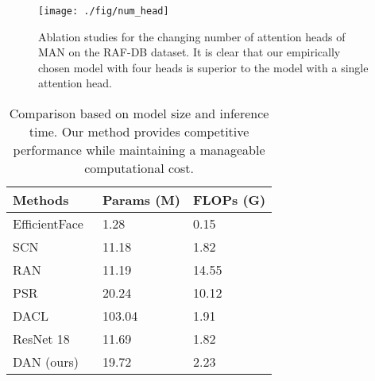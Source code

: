 \documentclass{article}
\begin{document}
\begin{figure}[]
\centering
{\texttt{[image: ./fig/num\_head]}}
\caption{Ablation studies for the changing number of attention heads of MAN on the RAF-DB dataset. It is clear that our empirically chosen model with four heads is superior to the model with a single attention head.}
\label{fig:num_head}
\end{figure}

\begin{table}[]
\caption{Comparison based on model size and inference time. Our method provides competitive performance while maintaining a manageable computational cost.}
\begin{tabularx}{\textwidth}{CCC}
    \toprule
	\textbf{Methods}              & \textbf{Params (M)}        & \textbf{FLOPs (G)} \\ 
    \midrule
    EfficientFace~\cite{zhao2021robust}   & 1.28    & 0.15    \\
    SCN~\cite{wang2020suppressing}    & 11.18    & 1.82    \\
	RAN~\cite{wang2020region}    & 11.19    & 14.55    \\
	PSR\cite{vo2020pyramid}         & 20.24   & 10.12  \\
	DACL~\cite{farzaneh2021facial}   & 103.04      &1.91      \\
	\midrule
    ResNet 18         & 11.69    & 1.82  \\
	DAN (ours)        &    19.72     &2.23   \\
    \bottomrule
\end{tabularx}
\label{table:flops}

\end{table}
\end{document}
